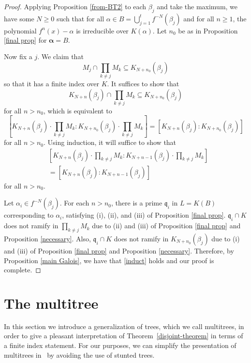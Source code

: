\documentclass[11pt]{amsart}
\theoremstyle{definition}
\theoremstyle{definition}
\numberwithin{thm}{section}
\numberwithin{equation}{thm}
\newcommand{\fq}{\ensuremath{{\mathfrak{q}}}}
\newcommand{\ba}{{\boldsymbol \alpha}}
\begin{document}
\begin{proof}
Applying Proposition \ref{from-BT2} to each $\beta_j$ and take the maximum,
we have some
$N\ge 0$ such that for all $\alpha \in B=\bigcup_{j=1}^t f^{-N}(\beta_j)$
and for all $n \geq 1$, the polynomial $f^n(x) - \alpha$ is
irreducible over $K(\alpha)$. Let $n_0$ be as
in Proposition \ref{final prop} for $\ba=B$.

Now fix a $j$. We claim that
\[  M_j \cap \prod_{k \ne j} M_k \subseteq K_{N+n_0}(\beta_j) \] so that
it has a finite index over $K$. It suffices to show that
\[ K_{N+n}(\beta_j) \cap  \prod_{k \ne j} M_k \subseteq K_{N+n_0}(\beta_j)\]
for all $n > n_0$, which is equivalent to
\begin{equation*}
  \left[K_{N+n}(\beta_j) \cdot \prod_{k \ne j} M_k :
  K_{N+n_0}(\beta_j) \cdot \prod_{k \ne j} M_k \right]
  = [K_{N+n} (\beta_j) : K_{N+n_0}(\beta_j)]
\end{equation*}   
for all $n > n_0$.  Using induction, it will suffice to show that
\begin{equation}\label{induct}
  \begin{split}
  & \left[K_{N+n}(\beta_j) \cdot \prod_{k \ne j}  M_k  : 
  K_{N+n-1}(\beta_j) \cdot \prod_{k \ne j} M_k \right] \\
   & = [K_{N+n} (\beta_j) : K_{N+n-1}(\beta_j)]
\end{split}
\end{equation} for all $n > n_0$.

Let $\alpha_i \in f^{-N}(\beta_j)$.
For each $n > n_0$, there is a prime $\fq_i$ in
$L=K(B)$ corresponding to $\alpha_i$, satisfying
(i), (ii), and (iii) of Proposition \ref{final prop}.
$\fq_i \cap K$ does not ramify in $\prod_{k\ne j} M_k$ due to (ii) and (iii)
of Proposition \ref{final prop} and Proposition \ref{necessary}.
Also, $\fq_i \cap K$ does not ramify in $K_{N+n_0}(\beta_j)$ due to (i)
and (iii) of Proposition \ref{final prop} and Proposition \ref{necessary}.
Therefore, by Proposition \ref{main Galois}, we have that
\ref{induct} holds and our proof is complete.

\end{proof}

\section{The multitree}\label{multitree}

In this section we introduce a generalization of trees, which we call 
multitrees, in order to give a pleasant interpretation of Theorem~\ref{disjoint-theorem} in 
terms of a finite index statement. For our purposes, we can simplify the presentation of multitrees 
in~\cite[Section 11]{BT2} by avoiding the use of stunted trees.
\end{document}
